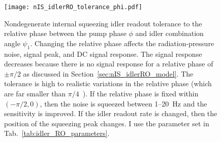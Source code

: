 \begin{figure}
    \centering
    \texttt{[image: nIS\_idlerRO\_tolerance\_phi.pdf]}
    \caption{ Nondegenerate internal squeezing idler readout tolerance to the relative phase between the pump phase $\phi$ and idler combination angle $\psi_1$. Changing the relative phase affects the radiation-pressure noise, signal peak, and DC signal response. The signal response decreases because there is no signal response for a relative phase of $\pm\pi/2$ as discussed in Section~\ref{sec:nIS_idlerRO_model}. The tolerance is high to realistic variations in the relative phase (which are far smaller than $\pi/4$~\cite{Yap:19}). If the relative phase is fixed within $(-\pi/2,0)$, then the noise is squeezed between 1--20~Hz and the sensitivity is improved. If the idler readout rate is changed, then the position of the squeezing peak changes. I use the parameter set in Tab.~\ref{tab:idler_RO_parameters}.}
    \label{fig:nIS_idlerRO_tolerance_phi}
\end{figure}

